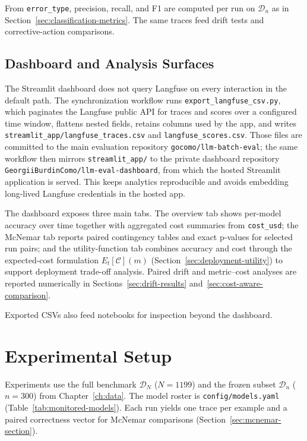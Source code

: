 From \texttt{error\_type}, precision, recall, and F1 are computed per run on $\mathcal{D}_n$ as in Section~\ref{sec:classification-metrics}. The same traces feed drift tests and corrective-action comparisons.

\subsection{Dashboard and Analysis Surfaces}

The Streamlit dashboard does not query Langfuse on every interaction in the default path. The synchronization workflow runs \texttt{export\_langfuse\_csv.py}, which paginates the Langfuse public API for traces and scores over a configured time window, flattens nested fields, retains columns used by the app, and writes \texttt{streamlit\_app/langfuse\_traces.csv} and \texttt{langfuse\_scores.csv}. Those files are committed to the main evaluation repository \texttt{gocomo/llm-batch-eval}; the same workflow then mirrors \texttt{streamlit\_app/} to the private dashboard repository \texttt{GeorgiiBurdinComo/llm-eval-dashboard}, from which the hosted Streamlit application is served. This keeps analytics reproducible and avoids embedding long-lived Langfuse credentials in the hosted app.

The dashboard exposes three main tabs. The overview tab shows per-model accuracy over time together with aggregated cost summaries from \texttt{cost\_usd}; the McNemar tab reports paired contingency tables and exact p-values for selected run pairs; and the utility-function tab combines accuracy and cost through the expected-cost formulation $E_t[\mathcal{C}](m)$ (Section~\ref{sec:deployment-utility}) to support deployment trade-off analysis. Paired drift and metric--cost analyses are reported numerically in Sections~\ref{sec:drift-results} and~\ref{sec:cost-aware-comparison}.

Exported CSVs also feed notebooks for inspection beyond the dashboard.
\FloatBarrier

\section{Experimental Setup}
\label{sec:experimental-design}

Experiments use the full benchmark \(\mathcal{D}_N\) (\(N=1199\)) and the frozen subset \(\mathcal{D}_n\) (\(n=300\)) from Chapter~\ref{ch:data}. The model roster is \texttt{config/models.yaml} (Table~\ref{tab:monitored-models}). Each run yields one trace per example and a paired correctness vector for McNemar comparisons (Section~\ref{sec:mcnemar-section}).

